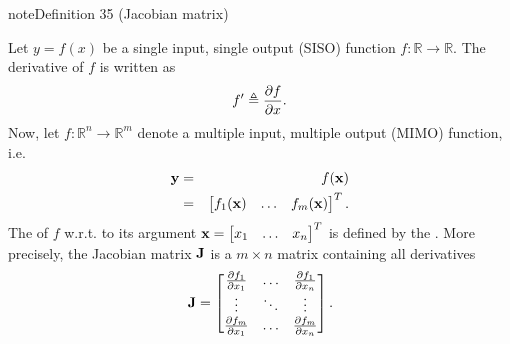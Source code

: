 \documentclass[letterpaper,10pt,english]{jupyterBook}
\begin{document}
\begin{sphinxadmonition}{note}{Definition 35 (Jacobian matrix)}



\sphinxAtStartPar
Let \(y = f(x)\) be a single input, single output (SISO) function \(f \colon \mathbb{R} \rightarrow \mathbb{R}\). The derivative of \(f\) is written as \begin{equation*}
\begin{split} f' \triangleq {\partial f \over \partial x}. \end{split}
\end{equation*} Now, let \(f \colon \mathbb{R}^n \rightarrow \mathbb{R}^m\) denote a multiple input, multiple output (MIMO) function, i.e.
\label{equation:neuralnets_backprop:c62502ff-7ffc-4b20-b73c-7ea0745a2843}\begin{eqnarray}
{\bf y} &=& f({\bf x})  \\
&=& \begin{bmatrix} f_1({\bf x}) & \ldots & f_m({\bf x})\end{bmatrix}^{T}.  
\end{eqnarray}
\sphinxAtStartPar
The  of \(f\) w.r.t. to its argument \( {\bf x} = \begin{bmatrix} x_{1} & \ldots & x_{n} \end{bmatrix}^{T} \) is defined by the . More precisely, the Jacobian matrix \({\bf J}\) is a \(m \times n\) matrix containing all  derivatives
\label{equation:neuralnets_backprop:e2e730f6-8f3b-4f37-a5bf-e5f972396151}\begin{equation}
{\bf J} = 
\begin{bmatrix}
{\partial f_1 \over \partial x_1} & \ldots & {\partial f_1 \over \partial x_n} \\
\vdots &  \ddots & \vdots \\
{\partial f_m \over \partial x_1} & \ldots & {\partial f_m \over \partial x_n}
\end{bmatrix}.
\end{equation}\end{sphinxadmonition}
\end{document}
